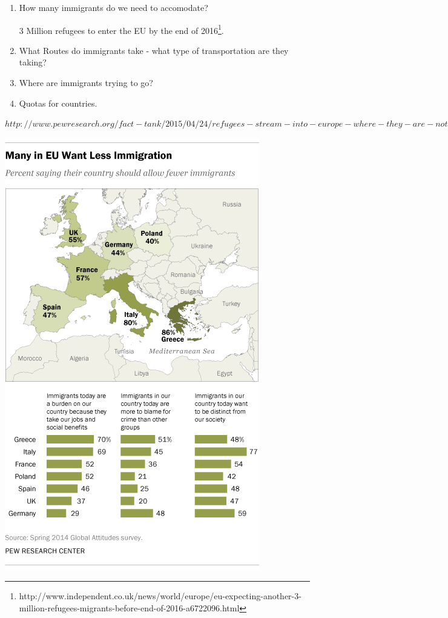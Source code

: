 \documentclass{article}
\begin{document}
\begin{enumerate}
    \item How many immigrants do we need to accomodate?

    3 Million refugees to enter the EU by the end of 2016\footnote{http://www.independent.co.uk/news/world/europe/eu-expecting-another-3-million-refugees-migrants-before-end-of-2016-a6722096.html}.

    \item What Routes do immigrants take - what type of transportation are they taking?

    \item Where are immigrants trying to go?
    \item Quotas for countries.
\end{enumerate}

$http://www.pewresearch.org/fact-tank/2015/04/24/refugees-stream-into-europe-where-they-are-not-welcomed-with-open-arms/ft_15-04-22_eu-immigration/$



\begin{center}
\includegraphics[scale=0.5]{ImmigrationPoll}
\end{center}
\end{document}
